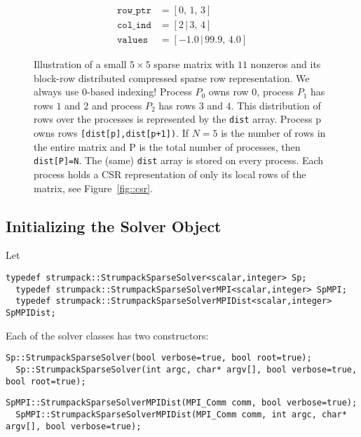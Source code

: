 \documentclass{article}
\begin{document}
\begin{figure}
\begin{center}
\begin{minipage}{.3\textwidth}
\begin{align*}
        \texttt{row\_ptr} &= [ 0, \, 1, \, 3 ] \\
        \texttt{col\_ind} &= [ 2  \,| \, 3, \, 4 ] \\
        \texttt{values} &= [ -1.0 \,| \, 99.9, \, 4.0 ]
      \end{align*}
    \end{minipage}
  \end{center}
  \caption{Illustration of a small $5 \times 5$ sparse matrix with
    $11$ nonzeros and its block-row distributed compressed sparse row
    representation. We always use $0$-based indexing! Process $P_0$
    owns row $0$, process $P_1$ has rows $1$ and $2$ and process $P_2$
    has rows $3$ and $4$. This distribution of rows over the processes
    is represented by the \texttt{dist} array. Process p owns rows
    \texttt{[dist[p],dist[p+1])}. If $N=5$ is the number of rows in
    the entire matrix and P is the total number of processes, then
    \texttt{dist[P]=N}. The (same) \texttt{dist} array is stored on
    every process. Each process holds a CSR representation of only its
    local rows of the matrix, see Figure~\ref{fig::csr}.}
  \label{fig::block-row-csr}
\end{figure}

\subsection{Initializing the Solver Object}\label{sec:initsolver}
Let
\begin{lstlisting}[style=C]
  typedef strumpack::StrumpackSparseSolver<scalar,integer> Sp;
  typedef strumpack::StrumpackSparseSolverMPI<scalar,integer> SpMPI;
  typedef strumpack::StrumpackSparseSolverMPIDist<scalar,integer> SpMPIDist;
\end{lstlisting}
Each of the solver classes has two constructors:
\begin{lstlisting}[style=C]
  Sp::StrumpackSparseSolver(bool verbose=true, bool root=true);
  Sp::StrumpackSparseSolver(int argc, char* argv[], bool verbose=true, bool root=true);
\end{lstlisting}

\begin{lstlisting}[style=C]
  SpMPI::StrumpackSparseSolverMPIDist(MPI_Comm comm, bool verbose=true);
  SpMPI::StrumpackSparseSolverMPIDist(MPI_Comm comm, int argc, char* argv[], bool verbose=true);
\end{lstlisting}
\end{document}
